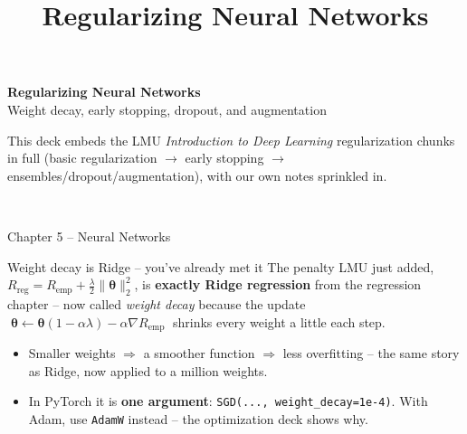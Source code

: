 \documentclass[aspectratio=43]{beamer}
\title{Regularizing Neural Networks}
\date{}
\begin{document}
\begin{frame}[plain]
  \vfill
  \begin{center}
    {\Large\color{popblue}\textbf{Regularizing Neural Networks}}\\[0.5em]
    {\large Weight decay, early stopping, dropout, and augmentation}\\[1.0em]
    \begin{minipage}{0.86\textwidth}\centering\small
      This deck embeds the LMU \emph{Introduction to Deep Learning} regularization chunks in
      full (basic regularization $\rightarrow$ early stopping $\rightarrow$
      ensembles/dropout/augmentation), with our own notes sprinkled in.
    \end{minipage}\\[0.8em]
  \end{center}
  \vfill
  {\footnotesize\color{gray} Chapter 5 -- Neural Networks}
\end{frame}



\begin{frame}{Weight decay is Ridge -- you've already met it}
  The penalty LMU just added, $R_{\text{reg}} = R_{\text{emp}} + \tfrac{\lambda}{2}\lVert\bm\theta\rVert_2^2$,
  is \textbf{exactly Ridge regression} from the regression chapter -- now called \emph{weight
  decay} because the update
  $\;\bm\theta \leftarrow \bm\theta(1-\alpha\lambda) - \alpha\nabla R_{\text{emp}}\;$ shrinks
  every weight a little each step.
  \vfill
  \begin{itemize}\small
    \item Smaller weights $\Rightarrow$ a smoother function $\Rightarrow$ less overfitting -- the
      same story as Ridge, now applied to a million weights.
    \item In PyTorch it is \textbf{one argument}: \texttt{SGD(..., weight\_decay=1e-4)}. With Adam,
      use \texttt{AdamW} instead -- the optimization deck shows why.
  \end{itemize}
  \vfill
\end{frame}
\end{document}
